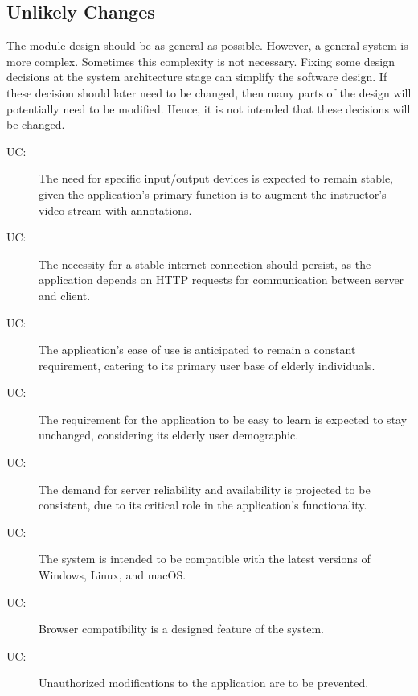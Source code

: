\documentclass[12pt, titlepage]{article}
\newcounter{ucnum}
\newcommand{\uctheucnum}{UC\theucnum}
\begin{document}
\subsection{Unlikely Changes} \label{SecUchange}

The module design should be as general as possible. However, a general system is
more complex. Sometimes this complexity is not necessary. Fixing some design
decisions at the system architecture stage can simplify the software design. If
these decision should later need to be changed, then many parts of the design
will potentially need to be modified. Hence, it is not intended that these
decisions will be changed.

\begin{description}
\item[ \uctheucnum:] The need for specific input/output devices is expected to remain stable, given the application's primary function is to augment the instructor’s video stream with annotations.

\item[ \uctheucnum:]  The necessity for a stable internet connection should persist, as the application depends on HTTP requests for communication between server and client.

\item[ \uctheucnum:]  The application's ease of use is anticipated to remain a constant requirement, catering to its primary user base of elderly individuals.

\item[ \uctheucnum:] The requirement for the application to be easy to learn is expected to stay unchanged, considering its elderly user demographic.

\item[ \uctheucnum:] The demand for server reliability and availability is projected to be consistent, due to its critical role in the application's functionality.

\item[ \uctheucnum:] The system is intended to be compatible with the latest versions of Windows, Linux, and macOS.

\item[ \uctheucnum:] Browser compatibility is a designed feature of the system.

\item[ \uctheucnum:] Unauthorized modifications to the application are to be prevented.


\end{description}
\end{document}

